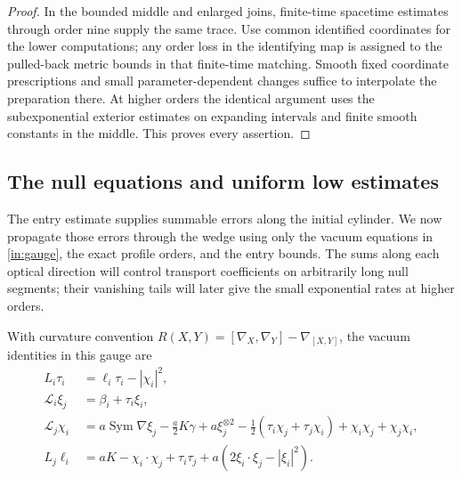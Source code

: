 \begin{proof}
In the bounded middle and enlarged joins, finite-time spacetime
estimates through order nine supply the same trace. Use common
identified coordinates for the lower computations; any order loss in
the identifying map is assigned to the pulled-back metric bounds in
that finite-time matching. Smooth fixed coordinate prescriptions and
small parameter-dependent changes suffice to interpolate the
preparation there. At higher orders the identical argument uses the
subexponential exterior estimates on expanding intervals and finite
smooth constants in the middle. This proves every assertion.
\end{proof}

\subsection{The null equations and uniform low estimates}

The entry estimate supplies summable errors along the initial cylinder.
We now propagate those errors through the wedge using only the vacuum
equations in \eqref{in:gauge}, the exact profile orders, and the entry
bounds. The sums along each optical direction will control transport
coefficients on arbitrarily long null segments; their vanishing tails
will later give the small exponential rates at higher orders.

With curvature convention $R(X,Y)=[\nabla_X,\nabla_Y]-\nabla_{[X,Y]}$,
the vacuum identities in this gauge are
\begin{equation}\label{in:vacuum}
\begin{aligned}
 L_i\tau_i&=\ell_i\tau_i-|\chi_i|^2,\\
 \mathscr L_i\xi_j&=\beta_i+\tau_i\xi_i,\\
 \mathscr L_j\chi_i
   &=a\operatorname{Sym}\nabla\xi_j-\tfrac a2K\gamma
      +a\xi_j^{\otimes2}
      -\tfrac12(\tau_i\chi_j+\tau_j\chi_i)
      +\chi_i\chi_j+\chi_j\chi_i,\\
 L_j\ell_i
   &=aK-\chi_i\mathbin{\cdot}\chi_j+\tau_i\tau_j
      +a(2\xi_i\mathbin{\cdot}\xi_j-|\xi_i|^2).
\end{aligned}
\end{equation}
